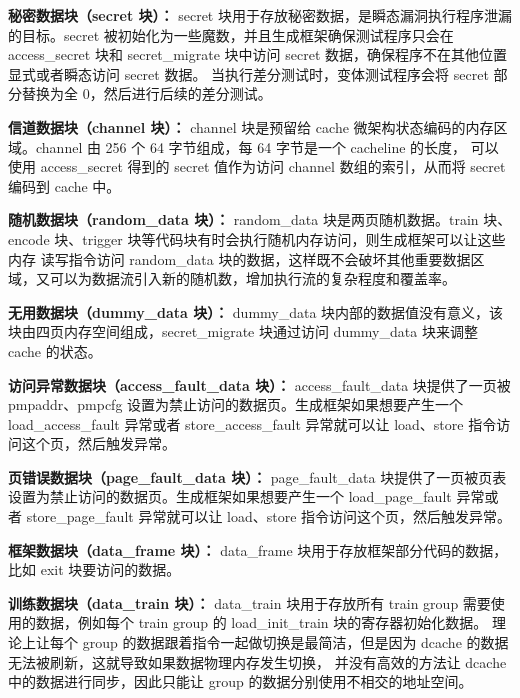 \textbf{秘密数据块（secret 块）：}
secret 块用于存放秘密数据，是瞬态漏洞执行程序泄漏的目标。secret 被初始化为一些魔数，并且生成框架确保测试程序只会在
 access\_secret 块和 secret\_migrate 块中访问 secret 数据，确保程序不在其他位置显式或者瞬态访问 secret 数据。
当执行差分测试时，变体测试程序会将 secret 部分替换为全 0，然后进行后续的差分测试。\par

\textbf{信道数据块（channel 块）：}
channel 块是预留给 cache 微架构状态编码的内存区域。channel 由 256 个 64 字节组成，每 64 字节是一个 cacheline 的长度，
可以使用 access\_secret 得到的 secret 值作为访问 channel 数组的索引，从而将 secret 编码到 cache 中。\par

\textbf{随机数据块（random\_data 块）：}
random\_data 块是两页随机数据。train 块、encode 块、trigger 块等代码块有时会执行随机内存访问，则生成框架可以让这些内存
读写指令访问 random\_data 块的数据，这样既不会破坏其他重要数据区域，又可以为数据流引入新的随机数，增加执行流的复杂程度和覆盖率。\par

\textbf{无用数据块（dummy\_data 块）：}
dummy\_data 块内部的数据值没有意义，该块由四页内存空间组成，secret\_migrate 块通过访问 dummy\_data 块来调整 cache 的状态。\par

\textbf{访问异常数据块（access\_fault\_data 块）：}
access\_fault\_data 块提供了一页被 pmpaddr、pmpcfg 设置为禁止访问的数据页。生成框架如果想要产生一个 load\_access\_fault 异常或者
store\_access\_fault 异常就可以让 load、store 指令访问这个页，然后触发异常。\par

\textbf{页错误数据块（page\_fault\_data 块）：}
page\_fault\_data 块提供了一页被页表设置为禁止访问的数据页。生成框架如果想要产生一个 load\_page\_fault 异常或者
store\_page\_fault 异常就可以让 load、store 指令访问这个页，然后触发异常。\par

\textbf{框架数据块（data\_frame 块）：}
data\_frame 块用于存放框架部分代码的数据，比如 exit 块要访问的数据。\par

\textbf{训练数据块（data\_train 块）：}
data\_train 块用于存放所有 train group 需要使用的数据，例如每个 train group 的 load\_init\_train 块的寄存器初始化数据。
理论上让每个 group 的数据跟着指令一起做切换是最简洁，但是因为 dcache 的数据无法被刷新，这就导致如果数据物理内存发生切换，
并没有高效的方法让 dcache 中的数据进行同步，因此只能让 group 的数据分别使用不相交的地址空间。\par

